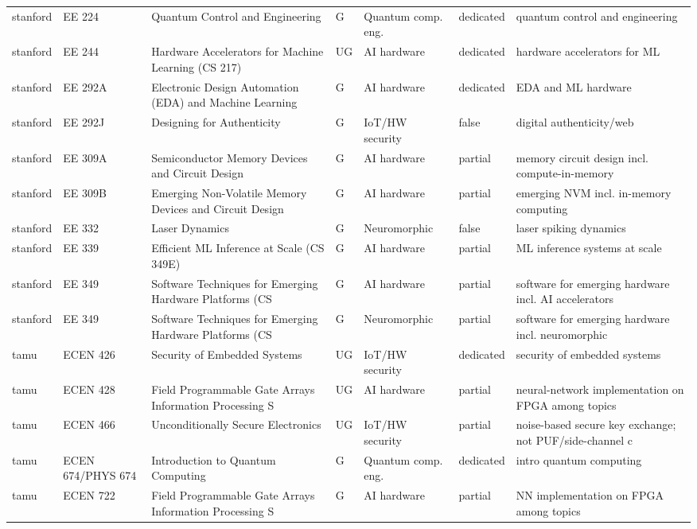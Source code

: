 \documentclass[10pt]{article}
\begin{document}
\begin{longtable}{@{}llL{4.6cm}llll@{}}
stanford & EE 224 & Quantum Control and Engineering & G & Quantum comp. eng. & dedicated & quantum control and engineering \\
stanford & EE 244 & Hardware Accelerators for Machine Learning (CS 217) & UG & AI hardware & dedicated & hardware accelerators for ML \\
stanford & EE 292A & Electronic Design Automation (EDA) and Machine Learning & G & AI hardware & dedicated & EDA and ML hardware \\
stanford & EE 292J & Designing for Authenticity & G & IoT/HW security & false & digital authenticity/web \\
stanford & EE 309A & Semiconductor Memory Devices and Circuit Design & G & AI hardware & partial & memory circuit design incl. compute-in-memory \\
stanford & EE 309B & Emerging Non-Volatile Memory Devices and Circuit Design & G & AI hardware & partial & emerging NVM incl. in-memory computing \\
stanford & EE 332 & Laser Dynamics & G & Neuromorphic & false & laser spiking dynamics \\
stanford & EE 339 & Efficient ML Inference at Scale (CS 349E) & G & AI hardware & partial & ML inference systems at scale \\
stanford & EE 349 & Software Techniques for Emerging Hardware Platforms (CS & G & AI hardware & partial & software for emerging hardware incl. AI accelerators \\
stanford & EE 349 & Software Techniques for Emerging Hardware Platforms (CS & G & Neuromorphic & partial & software for emerging hardware incl. neuromorphic \\
tamu & ECEN 426 & Security of Embedded Systems & UG & IoT/HW security & dedicated & security of embedded systems \\
tamu & ECEN 428 & Field Programmable Gate Arrays Information Processing S & UG & AI hardware & partial & neural-network implementation on FPGA among topics \\
tamu & ECEN 466 & Unconditionally Secure Electronics & UG & IoT/HW security & partial & noise-based secure key exchange; not PUF/side-channel c \\
tamu & ECEN 674/PHYS 674 & Introduction to Quantum Computing & G & Quantum comp. eng. & dedicated & intro quantum computing \\
tamu & ECEN 722 & Field Programmable Gate Arrays Information Processing S & G & AI hardware & partial & NN implementation on FPGA among topics \\

\end{longtable}
\end{document}
